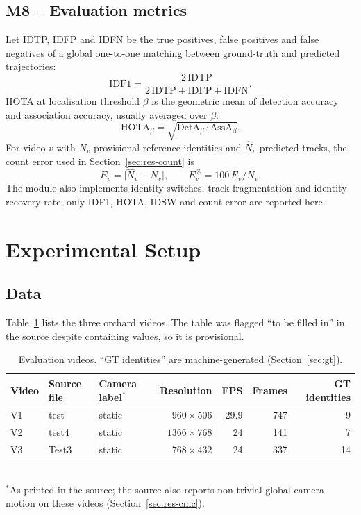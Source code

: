 \documentclass[11pt,a4paper]{article}
\newcommand{\IDF}{\mathrm{IDF1}}
\begin{document}
\subsection{M8 -- Evaluation metrics}
Let IDTP, IDFP and IDFN be the true positives, false positives and false negatives of a global one-to-one matching between ground-truth and predicted trajectories:
\begin{equation}
\IDF=\frac{2\,\mathrm{IDTP}}{2\,\mathrm{IDTP}+\mathrm{IDFP}+\mathrm{IDFN}} .\label{eq:idf1}
\end{equation}
HOTA at localisation threshold $\beta$ is the geometric mean of detection accuracy and association accuracy, usually averaged over $\beta$:
\begin{equation}
\mathrm{HOTA}_\beta=\sqrt{\mathrm{DetA}_\beta\cdot\mathrm{AssA}_\beta} .\label{eq:hota}
\end{equation}
For video $v$ with $N_v$ provisional-reference identities and $\hat N_v$ predicted tracks, the count error used in Section~\ref{sec:res-count} is
\begin{equation}
E_v=\lvert\hat N_v-N_v\rvert,\qquad E^{\%}_v=100\,E_v/N_v .\label{eq:counterr}
\end{equation}
The module also implements identity switches, track fragmentation and identity recovery rate; only IDF1, HOTA, IDSW and count error are reported here.

\section{Experimental Setup}\label{sec:setup}

\subsection{Data}
Table~\ref{tab:videos} lists the three orchard videos. The table was flagged ``to be filled in'' in the source despite containing values, so it is provisional.

\begin{table}[t]
\caption{Evaluation videos. ``GT identities'' are machine-generated (Section~\ref{sec:gt}).}\label{tab:videos}
\centering\normalsize
\begin{tabular}{lllrrrr}
\toprule
Video & Source file & Camera label$^{*}$ & Resolution & FPS & Frames & GT identities\\
\midrule
V1 & test & static & $960\times506$ & 29.9 & 747 & 9\\
V2 & test4 & static & $1366\times768$ & 24 & 141 & 7\\
V3 & Test3 & static & $768\times432$ & 24 & 337 & 14\\
\bottomrule
\end{tabular}\\[2pt]
{\footnotesize $^{*}$As printed in the source; the source also reports non-trivial global camera motion on these videos (Section~\ref{sec:res-cmc}).}
\end{table}
\end{document}
